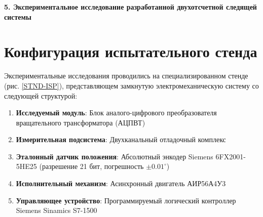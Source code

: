 


\newpage

\noindent\textbf{\large 5.  Экспериментальное исследование разработанной двухотсчетной следящей системы}


\section{Конфигурация испытательного стенда}
Экспериментальные исследования проводились на специализированном стенде (рис. \ref{STND-ISP}), представляющем замкнутую электромеханическую систему 
со следующей структурой:
\begin{enumerate}
    \item \textbf{Исследуемый модуль}: Блок аналого-цифрового преобразователя вращательного трансформатора (АЦПВТ)
    \item \textbf{Измерительная подсистема}: Двухканальный отладочный комплекс
    \item \textbf{Эталонный датчик положения}: Абсолютный энкодер Siemens 6FX2001-5HE25 (разрешение 21 бит, погрешность $\pm0.01^\circ$)
    \item \textbf{Исполнительный механизм}: Асинхронный двигатель АИР56А4У3 
    \item \textbf{Управляющее устройство}: Программируемый логический контроллер Siemens Sinamics S7-1500
\end{enumerate}


